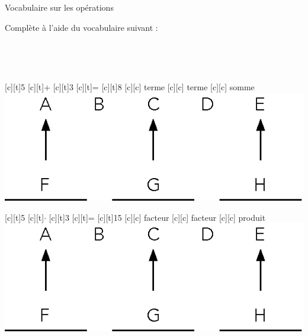 \documentclass[a4paper,11pt]{report}
\begin{document}
\begin{resolu}{Vocabulaire sur les opérations}
{Complète à l'aide du vocabulaire suivant :
\begin{center}
 $\quad$  $\quad$  $\quad$  $\quad$
\end{center}
\begin{center}
 $\quad$
 $\quad$
 $\quad$
 $\quad$
\end{center}

\begin{minipage}{0.45\linewidth}
\begin{center}
\begin{psfrags}
[c][t]{5}
[c][t]{+}
[c][t]{3}
[c][t]{=}
[c][t]{8}
[c][c]{{\color{blue} terme}}
[c][c]{{\color{blue} terme}}
[c][c]{{\color{blue} somme}}
\includegraphics[scale=1]{media/no-30/vocabulaire4op.eps}
\end{psfrags}
\end{center}
\end{minipage}
\hfill
\begin{minipage}{0.45\linewidth}
\begin{center}
\begin{psfrags}
[c][t]{5}
[c][t]{$\cdot$}
[c][t]{3}
[c][t]{=}
[c][t]{15}
[c][c]{{\color{blue} facteur}}
[c][c]{{\color{blue} facteur}}
[c][c]{{\color{blue} produit}}
\includegraphics[scale=1]{media/no-30/vocabulaire4op.eps}
\end{psfrags}
\end{center}
\end{minipage}

}
\end{resolu}
\end{document}
